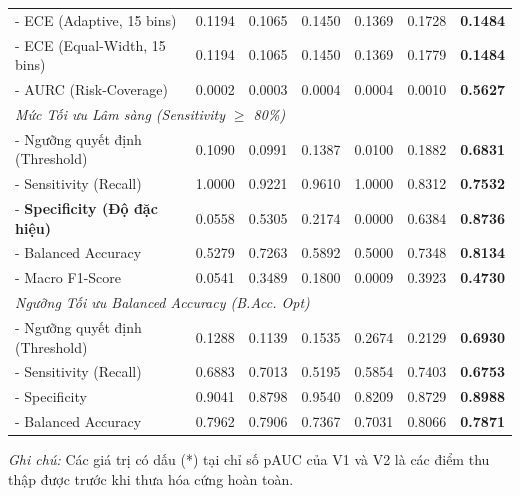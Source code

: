 \documentclass[11pt, a4paper]{article}
\begin{document}
\begin{table}[t]
{\begin{tabular}{lcccccc}
- ECE (Adaptive, 15 bins) & 0.1194 & 0.1065 & 0.1450 & 0.1369 & 0.1728 & \textbf{0.1484} \\
- ECE (Equal-Width, 15 bins) & 0.1194 & 0.1065 & 0.1450 & 0.1369 & 0.1779 & \textbf{0.1484} \\
- AURC (Risk-Coverage) & 0.0002 & 0.0003 & 0.0004 & 0.0004 & 0.0010 & \textbf{0.5627} \\
\midrule
\multicolumn{7}{l}{\emph{Mức Tối ưu Lâm sàng (Sensitivity $\ge$ 80\%)}} \\
- Ngưỡng quyết định (Threshold) & 0.1090 & 0.0991 & 0.1387 & 0.0100 & 0.1882 & \textbf{0.6831} \\
- Sensitivity (Recall) & 1.0000 & 0.9221 & 0.9610 & 1.0000 & 0.8312 & \textbf{0.7532} \\
- \textbf{Specificity (Độ đặc hiệu)} & 0.0558 & 0.5305 & 0.2174 & 0.0000 & 0.6384 & \textbf{0.8736} \\
- Balanced Accuracy & 0.5279 & 0.7263 & 0.5892 & 0.5000 & 0.7348 & \textbf{0.8134} \\
- Macro F1-Score & 0.0541 & 0.3489 & 0.1800 & 0.0009 & 0.3923 & \textbf{0.4730} \\
\midrule
\multicolumn{7}{l}{\emph{Ngưỡng Tối ưu Balanced Accuracy (B.Acc. Opt)}} \\
- Ngưỡng quyết định (Threshold) & 0.1288 & 0.1139 & 0.1535 & 0.2674 & 0.2129 & \textbf{0.6930} \\
- Sensitivity (Recall) & 0.6883 & 0.7013 & 0.5195 & 0.5854 & 0.7403 & \textbf{0.6753} \\
- Specificity & 0.9041 & 0.8798 & 0.9540 & 0.8209 & 0.8729 & \textbf{0.8988} \\
- Balanced Accuracy & 0.7962 & 0.7906 & 0.7367 & 0.7031 & 0.8066 & \textbf{0.7871} \\
\bottomrule
\end{tabular}
}
\begin{flushleft}
\small
\textit{Ghi chú:} Các giá trị có dấu (*) tại chỉ số pAUC của V1 và V2 là các điểm thu thập được trước khi thưa hóa cứng hoàn toàn.
\end{flushleft}
\end{table}
\end{document}
